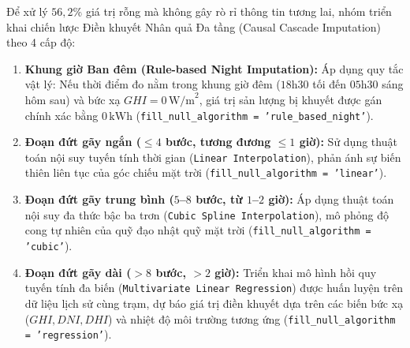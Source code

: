 \documentclass[12pt, a4paper]{report}
\begin{document}
Để xử lý $56{,}2\%$ giá trị rỗng mà không gây rò rỉ thông tin tương lai, nhóm triển khai chiến lược Điền khuyết Nhân quả Đa tầng (Causal Cascade Imputation) theo 4 cấp độ:

\begin{enumerate}[label=\alph*., leftmargin=*]
    \item \textbf{Khung giờ Ban đêm (Rule-based Night Imputation):} Áp dụng quy tắc vật lý: Nếu thời điểm đo nằm trong khung giờ đêm ($18\text{h}30$ tối đến $05\text{h}30$ sáng hôm sau) và bức xạ $GHI = 0\,\text{W/m}^2$, giá trị sản lượng bị khuyết được gán chính xác bằng $0\,\text{kWh}$ (\texttt{fill\_null\_algorithm = 'rule\_based\_night'}).
    \item \textbf{Đoạn đứt gãy ngắn ($\le 4$ bước, tương đương $\le 1$ giờ):} Sử dụng thuật toán nội suy tuyến tính thời gian (\texttt{Linear Interpolation}), phản ánh sự biến thiên liên tục của góc chiếu mặt trời (\texttt{fill\_null\_algorithm = 'linear'}).
    \item \textbf{Đoạn đứt gãy trung bình ($5$--$8$ bước, từ $1$--$2$ giờ):} Áp dụng thuật toán nội suy đa thức bậc ba trơn (\texttt{Cubic Spline Interpolation}), mô phỏng độ cong tự nhiên của quỹ đạo nhật quỹ mặt trời (\texttt{fill\_null\_algorithm = 'cubic'}).
    \item \textbf{Đoạn đứt gãy dài ($> 8$ bước, $> 2$ giờ):} Triển khai mô hình hồi quy tuyến tính đa biến (\texttt{Multivariate Linear Regression}) được huấn luyện trên dữ liệu lịch sử cùng trạm, dự báo giá trị điền khuyết dựa trên các biến bức xạ ($GHI, DNI, DHI$) và nhiệt độ môi trường tương ứng (\texttt{fill\_null\_algorithm = 'regression'}).
\end{enumerate}
\end{document}

